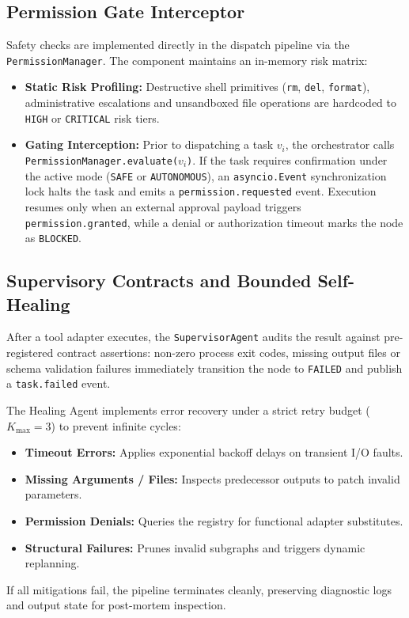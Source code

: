 \documentclass[conference]{IEEEtran}
\begin{document}
\subsection{Permission Gate Interceptor}
Safety checks are implemented directly in the dispatch pipeline via the \texttt{PermissionManager}. The component maintains an in-memory risk matrix:
\begin{itemize}
    \item \textbf{Static Risk Profiling:} Destructive shell primitives (\texttt{rm}, \texttt{del}, \texttt{format}), administrative escalations and unsandboxed file operations are hardcoded to \texttt{HIGH} or \texttt{CRITICAL} risk tiers.
    \item \textbf{Gating Interception:} Prior to dispatching a task $v_i$, the orchestrator calls \texttt{PermissionManager.evaluate($v_i$)}. If the task requires confirmation under the active mode (\texttt{SAFE} or \texttt{AUTONOMOUS}), an \texttt{asyncio.Event} synchronization lock halts the task and emits a \texttt{permission.requested} event. Execution resumes only when an external approval payload triggers \texttt{permission.granted}, while a denial or authorization timeout marks the node as \texttt{BLOCKED}.
\end{itemize}

\subsection{Supervisory Contracts and Bounded Self-Healing}
After a tool adapter executes, the \texttt{SupervisorAgent} audits the result against pre-registered contract assertions: non-zero process exit codes, missing output files or schema validation failures immediately transition the node to \texttt{FAILED} and publish a \texttt{task.failed} event.

The Healing Agent implements error recovery under a strict retry budget ($K_{\text{max}} = 3$) to prevent infinite cycles:
\begin{itemize}
    \item \textbf{Timeout Errors:} Applies exponential backoff delays on transient I/O faults.
    \item \textbf{Missing Arguments / Files:} Inspects predecessor outputs to patch invalid parameters.
    \item \textbf{Permission Denials:} Queries the registry for functional adapter substitutes.
    \item \textbf{Structural Failures:} Prunes invalid subgraphs and triggers dynamic replanning.
\end{itemize}
If all mitigations fail, the pipeline terminates cleanly, preserving diagnostic logs and output state for post-mortem inspection.
\end{document}
